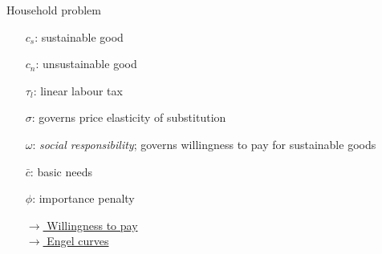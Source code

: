 \documentclass[11pt,aspectratio=169]{beamer}
\begin{document}
\begin{frame}{Household problem}
		\small
		\begin{minipage}[t!]{0.32\textwidth}
			\vspace{7mm}
			\begin{itemize}
				\item[] $c_s$: sustainable good \vspace{-2mm}
				\item[] $c_n$: unsustainable good\vspace{-2mm}
				\item[] $\tau_l$: linear labour tax
				\item[]
				\item[]
			\end{itemize}
		\end{minipage}
		\begin{minipage}[t!]{0.35\textwidth}
			\vspace{8mm}
			\begin{itemize}
				\item[$\sigma$:]  governs price elasticity of substitution%
				\vspace{-2mm}
				\item[$\omega$:] \textit{social responsibility}; governs willingness to pay for sustainable goods %
				\item[]	
			\end{itemize}
		\end{minipage}
		\begin{minipage}[t!]{0.3\textwidth}
			\vspace{7mm}
			\begin{itemize}	
				\item[] $\bar{c}$: basic needs
				\vspace{-2mm}
				\item[] $\phi$: importance penalty
				\vspace{-2mm}	
				\item[]%
				\item[]
				\item[]
				
				\vspace{-2mm}
				\hfill	\hyperlink{WTP}{\tiny{$\rightarrow$ Willingness to pay}}\\ \vspace{-2mm} %
				\hfill \hyperlink{engel}{\tiny{$\rightarrow$ Engel curves}}
			\end{itemize}
		\end{minipage}
	\end{frame}
	
\end{document}
